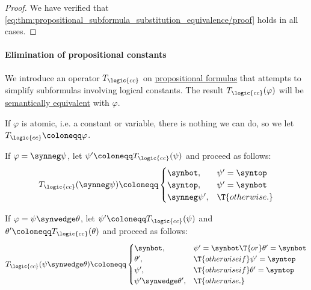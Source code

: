 \begin{proof}
  We have verified that \eqref{eq:thm:propositional_subformula_substitution_equivalence/proof} holds in all cases.
\end{proof}

\paragraph{Elimination of propositional constants}

\begin{algorithm}\label{alg:propositional_constant_collapse}
  We introduce an operator \( T_{\logic{cc}} \) on \hyperref[def:propositional_formula]{propositional formulas} that attempts to simplify subformulas involving logical constants. The result \( T_{\logic{cc}}(\varphi) \) will be \hyperref[def:first_order_semantics/equivalence]{semantically equivalent} with \( \varphi \).

  \begin{thmenum}
     If \( \varphi \) is atomic, i.e. a constant or variable, there is nothing we can do, so we let \( T_{\logic{cc}} \coloneqq \varphi \).

     If \( \varphi = \synneg \psi \), let \( \psi' \coloneqq T_{\logic{cc}}(\psi) \) and proceed as follows:
    \begin{equation*}
      T_{\logic{cc}}(\synneg \psi) \coloneqq \begin{cases}
        \synbot,       &\psi' = \syntop \\
        \syntop,       &\psi' = \synbot \\
        \synneg \psi', &\T{otherwise.}
      \end{cases}
    \end{equation*}

     If \( \varphi = \psi \synwedge \theta \), let \( \psi' \coloneqq T_{\logic{cc}}(\psi) \) and \( \theta' \coloneqq T_{\logic{cc}}(\theta) \) and proceed as follows:
    \begin{equation*}
      T_{\logic{cc}}(\psi \synwedge \theta) \coloneqq \begin{cases}
        \synbot,                   &\psi' = \synbot \T{or} \theta' = \synbot \\
        \theta',                   &\T{otherwise if} \psi' = \syntop \\
        \psi',                     &\T{otherwise if} \theta' = \syntop \\
        \psi' \synwedge \theta',   &\T{otherwise.}
      \end{cases}
    \end{equation*}


\end{thmenum}
\end{algorithm}
